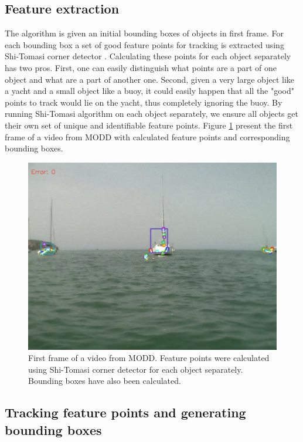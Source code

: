 \documentclass[10pt,twocolumn,letterpaper]{article}
\begin{document}
\subsection{Feature extraction}\label{sofot_init}

The algorithm is given an initial bounding boxes of objects in first frame. For each bounding box
a set of good feature points for tracking is extracted using Shi-Tomasi corner detector \cite{shi-tomasi}.
Calculating these points for each object separately has two pros. First, one can easily distinguish
what points are a part of one object and what are a part of another one. Second,
given a very large object like a yacht and a small object like a buoy, it could easily
happen that all the "good" points to track would lie on the yacht, thus completely ignoring the buoy.
By running Shi-Tomasi algorithm on each object separately, we ensure all objects get their own
set of unique and identifiable feature points. Figure \ref{fig:first_frame} present the first frame
of a video from MODD with calculated feature points and corresponding bounding boxes.

\begin{figure}
   \centering
   \includegraphics[width=\linewidth]{images/screen_1.png}
   \caption{First frame of a video from MODD. Feature points were calculated using Shi-Tomasi corner
   detector for each object separately. Bounding boxes have also been calculated.}
   \label{fig:first_frame}
\end{figure}

\subsection{Tracking feature points and generating bounding boxes}\label{sofot_bbox}
\end{document}
